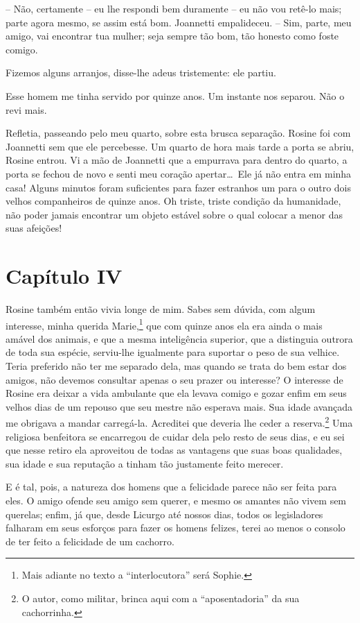 -- Não, certamente -- eu lhe respondi bem duramente -- eu não vou retê-lo
mais; parte agora mesmo, se assim está bom. 
Joannetti empalideceu. -- Sim, parte, meu amigo, vai encontrar tua mulher; 
seja sempre tão bom, tão honesto como foste comigo.

 Fizemos alguns arranjos, disse-lhe adeus tristemente: ele partiu.

 Esse homem me tinha servido por quinze anos. Um instante nos separou.
Não o revi mais.

 Refletia, passeando pelo meu quarto, sobre esta brusca separação.
Rosine foi com Joannetti sem que ele percebesse. Um quarto de hora mais
tarde a porta se abriu, Rosine entrou. Vi a mão de Joannetti que a
empurrava para dentro do quarto, a porta se fechou de novo e senti meu
coração apertar\ldots\  Ele já não entra em minha casa! Alguns minutos
foram suficientes para fazer estranhos um para o outro dois velhos
companheiros de quinze anos. Oh triste, triste condição da humanidade,
não poder jamais encontrar um objeto estável sobre o qual colocar a
menor das suas afeições!

\section*{Capítulo IV}

 Rosine também então vivia longe de mim. Sabes sem dúvida, com algum
interesse, minha querida Marie,\footnote{ Mais adiante no texto a
``interlocutora'' será Sophie.} que com quinze anos ela era ainda o mais
amável dos animais, e que a mesma inteligência superior, que a
distinguia outrora de toda sua espécie, serviu-lhe igualmente para
suportar o peso de sua velhice. Teria preferido não ter me separado
dela, mas quando se trata do bem estar dos amigos, não devemos
consultar apenas o seu prazer ou interesse? O interesse de Rosine era
deixar a vida ambulante que ela levava comigo e gozar enfim em seus
velhos dias de um repouso que seu mestre não esperava mais. Sua idade
avançada me obrigava a mandar carregá-la. Acreditei que deveria lhe
ceder a reserva.\footnote{ O autor, como militar, brinca aqui com a
``aposentadoria'' da sua cachorrinha.} Uma religiosa benfeitora se
encarregou de cuidar dela pelo resto de seus dias, e eu sei que nesse
retiro ela aproveitou de todas as vantagens que suas boas qualidades,
sua idade e sua reputação a tinham tão justamente feito merecer. 

 E é tal, pois, a natureza dos homens que a felicidade parece não ser
feita para eles. O amigo ofende seu amigo sem querer, e mesmo os
amantes não vivem sem querelas; enfim, já que, desde Licurgo até nossos
dias, todos os legisladores falharam em seus esforços para fazer os
homens felizes, terei ao menos o consolo de ter feito a felicidade de
um cachorro.

